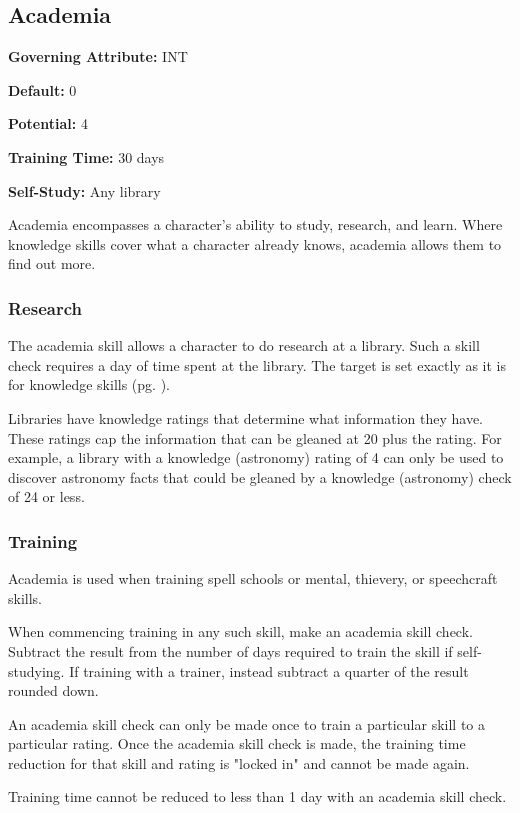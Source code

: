 \subsection{Academia}\label{skill:academia}

\noindent
\textbf{Governing Attribute:} INT

\noindent
\textbf{Default:} 0

\noindent
\textbf{Potential:} 4

\noindent
\textbf{Training Time:} 30 days

\noindent
\textbf{Self-Study:} Any library

Academia encompasses a character's ability to study, research, and learn.
Where knowledge skills cover what a character already knows, academia allows
them to find out more.

\subsubsection*{Research}
The academia skill allows a character to do research at a library. Such a
skill check requires a day of time spent at the library. The target is set
exactly as it is for knowledge skills (pg. \pageref{knowledge}).

Libraries have knowledge ratings that determine what information they have.
These ratings cap the information that can be gleaned at 20 plus the rating.
For example, a library with a knowledge (astronomy) rating of 4 can only be used
to discover astronomy facts that could be gleaned by a knowledge (astronomy)
check of 24 or less.

\subsubsection*{Training}
Academia is used when training spell schools or mental, thievery, or
speechcraft skills.

When commencing training in any such skill, make an
academia skill check. Subtract the result from the number of days required to
train the skill if self-studying. If training with a trainer, instead subtract
a quarter of the result rounded down.

An academia skill check can only be made once to train a particular skill to a
particular rating. Once the academia skill check is made, the training time
reduction for that skill and rating is "locked in" and cannot be made again.

Training time cannot be reduced to less than 1 day with an academia skill
check.


